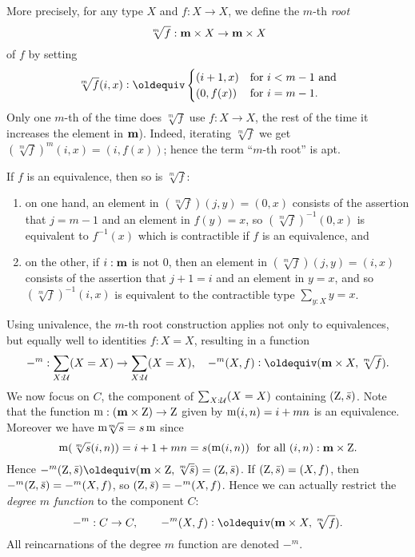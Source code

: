 \begin{example}
More precisely, for any type $X$ and $f:X\to X$, we define the $m$-th \emph{root}
\[
{\sqrt[m]f} : {\mathbf{m}\times X} \to {\mathbf{m}\times X}
\]
of $f$ by setting 
\[
\sqrt[m]f(i,x)\defeq
\begin{cases}
  (i+1,x)& \text{for $i<m-1$ and}\\
  (0,f(x))& \text{for $i=m-1$}.
\end{cases}
\] 
Only one $m$-th of the time does $\sqrt[m]f$ use $f:X\to X$,
the rest of the time it increases the element in $\mathbf{m}$).
Indeed, iterating $\sqrt[m]f$ we get $(\sqrt[m]f)^m(i,x)=(i,f(x))$; 
hence the term ``$m$-th root'' is apt.

If $f$ is an equivalence, then so is $\sqrt[m]f$:
\begin{enumerate}
\item on one hand, an element in  $(\sqrt[m]f)(j,y) = (0,x)$ consists of the assertion that  $j=m-1$ and an element in $f(y)=x$,
so  $(\sqrt[m]f)^{-1}(0,x)$ is equivalent 
to $f^{-1}(x)$ which is contractible if $f$ is an equivalence, and 
\item on the other, if $i:\mathbf{m}$ is not $0$, then 
 an element in $(\sqrt[m]f)(j,y)=(i,x)$
 consists of the assertion that $j+1=i$ and an element in   $y=x$, and so 
$(\sqrt[m]f)^{-1}(i,x)$ is equivalent to the contractible type $\sum_{y:X}y=x$.
\end{enumerate}

Using univalence, the $m$-th root construction applies not only to equivalences, 
but equally well to identities $f:X=X$, resulting in a function 
\[
-^m:\sum_{X:\UU}(X=X)\to\sum_{X:\UU}(X=X),\quad -^m(X,f)\defeq(\bn m\times X,\sqrt[m]f).
\]
We now focus on  $C$, the component of $\sum_{X:\mathcal{U}}(X=X)$ containing $(\mathrm{Z},\bar {s})$.
Note that the function $\mathop{\mathrm{m}} : (\mathbf{m}\times \mathrm{Z}) \to \mathrm{Z}$ 
given by $\mathop{\mathrm{m}}(i,n)=i+mn$ is an equivalence. 
Moreover we have ${\mathop{\mathrm{m}}\!\!\sqrt[m]s} = {s\mathop{\mathrm{m}}}$ since 
\[
\mathop{\mathrm{m}}(\sqrt[m]s(i,n)) = i+1+mn = s(\mathop{\mathrm{m}}(i,n))
~~\text{for all $(i,n):\mathbf{m}\times \mathrm{Z}$}.
\]  
Hence $ -^m(\zet,\etop{s}) \jdeq (\bn m\times\zet,\sqrt[m]{\etop{s}}) = (\zet,\etop{s})$. 
If $(\mathrm{Z},\bar {s})=(X,f)$, then $-^m(\mathrm{Z},\bar {s})=-^m(X,f)$, 
so $(\mathrm{Z},\bar {s})=-^m(X,f)$. Hence we can actually restrict the
\emph{degree $m$ function} to the component $C$: 
\[
-^m:C\to C,\qquad -^m(X,f)\defeq(\bn m\times X,\sqrt[m]f).%
\]
All reincarnations of the degree $m$ function are denoted $-^m$.


\end{example}
